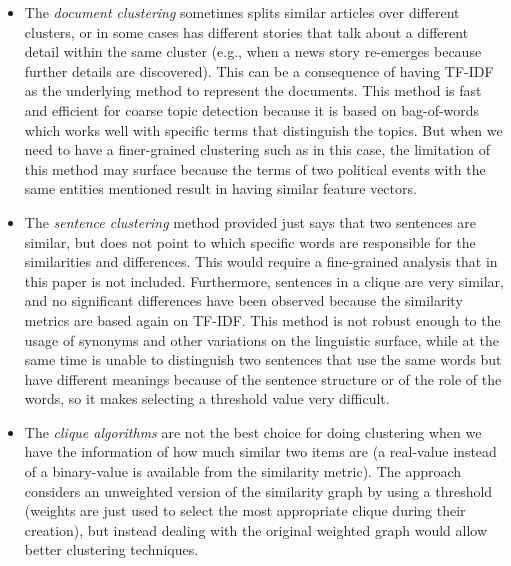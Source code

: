 \begin{itemize}
    \item The \emph{document clustering} sometimes splits similar articles over different clusters, or in some cases has different stories that talk about a different detail within the same cluster (e.g., when a news story re-emerges because further details are discovered).
    This can be a consequence of having TF-IDF as the underlying method to represent the documents.
    This method is fast and efficient for coarse topic detection because it is based on bag-of-words which works well with specific terms that distinguish the topics.
    But when we need to have a finer-grained clustering such as in this case, the limitation of this method may surface because the terms of two political events with the same entities mentioned result in having similar feature vectors.
    \item The \emph{sentence clustering} method provided just says that two sentences are similar, but does not point to which specific words are responsible for the similarities and differences. This would require a fine-grained analysis that in this paper is not included. Furthermore, sentences in a clique are very similar, and no significant differences have been observed because the similarity metrics are based again on TF-IDF. This method is not robust enough to the usage of synonyms and other variations on the linguistic surface, while at the same time is unable to distinguish two sentences that use the same words but have different meanings because of the sentence structure or of the role of the words, so it makes selecting a threshold value very difficult.
    \item The \emph{clique algorithms} are not the best choice for doing clustering when we have the information of how much similar two items are (a real-value instead of a binary-value is available from the similarity metric). The approach considers an unweighted version of the similarity graph by using a threshold (weights are just used to select the most appropriate clique during their creation), but instead dealing with the original weighted graph would allow better clustering techniques. %
\end{itemize}



